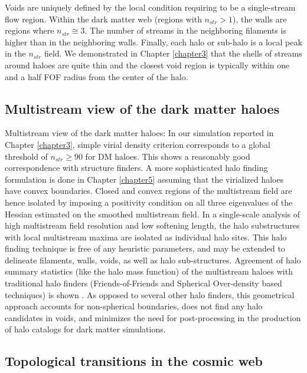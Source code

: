 Voids are uniquely defined by the local condition requiring to be a single-stream flow region. Within the dark matter web (regions with $n_{str} > 1$), the walls are regions where $n_{str} \cong 3$. The number of streams in the neighboring filaments is higher than in the neighboring walls. Finally, each halo or sub-halo is a local peak in the $n_{str}$ field. We demonstrated in Chapter \ref{chapter3} that the shells of streams around haloes are quite thin and the closest void region is typically within one and a half FOF radius from the center of the halo.

\subsection{Multistream view of the dark matter haloes}

Multistream view of the dark matter haloes: In our simulation reported in Chapter \ref{chapter3}, simple virial density criterion corresponds to a global threshold of $n_{str} \geq 90$ for DM haloes. This shows a reasonably good correspondence with structure finders. A more sophisticated halo finding formulation is done in Chapter \ref{chapter5} assuming that the virialized haloes have convex boundaries. Closed and convex regions of the multistream field are hence isolated by imposing a positivity condition on all three eigenvalues of the Hessian estimated on the smoothed multistream field. In a single-scale analysis of high multistream field resolution and low softening length, the halo substructures with local multistream maxima are isolated as individual halo sites. This halo finding technique is free of any heuristic parameters, and may be extended to delineate filaments, walls, voids, as well as halo sub-structures. Agreement of halo summary statistics (like the halo mass function) of the multistream haloes with traditional halo finders (Friends-of-Friends and Spherical Over-density based techniques) is shown \cite{Ramachandra2017b}. As opposed to several other halo finders, this geometrical approach accounts for non-spherical boundaries, does not find any halo candidates in voids, and minimizes the need for post-processing in the production of halo catalogs for dark matter simulations.   

\subsection{Topological transitions in the cosmic web}

